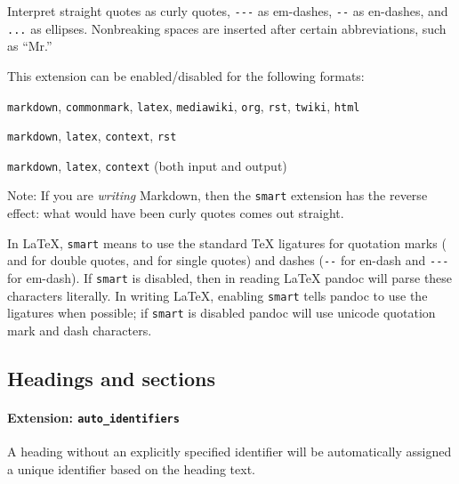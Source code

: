 Interpret straight quotes as curly quotes, \texttt{-\/-\/-} as
em-dashes, \texttt{-\/-} as en-dashes, and \texttt{...} as ellipses.
Nonbreaking spaces are inserted after certain abbreviations, such as
``Mr.''

This extension can be enabled/disabled for the following formats:

\begin{description}
\tightlist
\item[input formats]
\texttt{markdown}, \texttt{commonmark}, \texttt{latex},
\texttt{mediawiki}, \texttt{org}, \texttt{rst}, \texttt{twiki},
\texttt{html}
\item[output formats]
\texttt{markdown}, \texttt{latex}, \texttt{context}, \texttt{rst}
\item[enabled by default in]
\texttt{markdown}, \texttt{latex}, \texttt{context} (both input and
output)
\end{description}

Note: If you are \emph{writing} Markdown, then the \texttt{smart}
extension has the reverse effect: what would have been curly quotes
comes out straight.

In LaTeX, \texttt{smart} means to use the standard TeX ligatures for
quotation marks (\texttt{\textasciigrave{}\textasciigrave{}} and
\texttt{\textquotesingle{}\textquotesingle{}} for double quotes,
\texttt{\textasciigrave{}} and \texttt{\textquotesingle{}} for single
quotes) and dashes (\texttt{-\/-} for en-dash and \texttt{-\/-\/-} for
em-dash). If \texttt{smart} is disabled, then in reading LaTeX pandoc
will parse these characters literally. In writing LaTeX, enabling
\texttt{smart} tells pandoc to use the ligatures when possible; if
\texttt{smart} is disabled pandoc will use unicode quotation mark and
dash characters.

\hypertarget{headings-and-sections}{%
\subsection{Headings and sections}\label{headings-and-sections}}

\hypertarget{extension-auto_identifiers}{%
\paragraph{\texorpdfstring{Extension:
\texttt{auto\_identifiers}}{Extension: auto\_identifiers}}\label{extension-auto_identifiers}}

A heading without an explicitly specified identifier will be
automatically assigned a unique identifier based on the heading text.

